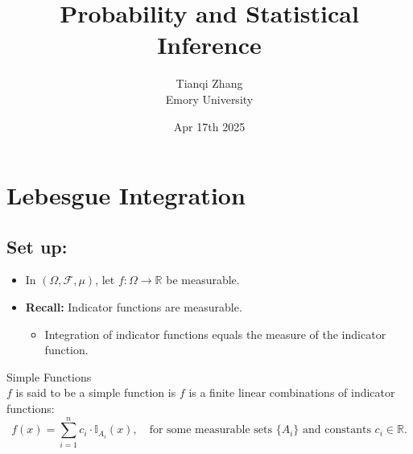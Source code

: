 

\title{\textbf{%
               Probability and Statistical Inference}}
\author{Tianqi Zhang\\
Emory University}
\date{Apr 17th 2025}


\maketitle


\setcounter{section}{12}
\section{Lebesgue Integration}
\subsection{Set up:}
\begin{itemize}
    \item In \((\Omega, \mathscr{F}, \mu)\), let \( f: \Omega \to \mathbb{R} \) be measurable.
    \item \textbf{Recall:} Indicator functions are measurable.
    \begin{itemize}
        \item Integration of indicator functions equals the measure of the indicator function.
    \end{itemize}
\end{itemize}

\begin{df}{Simple Functions}\\
$f$ is said to be a simple function is $f$ is a finite linear combinations of indicator functions:
\[
f(x) = \sum_{i=1}^n c_i \cdot \mathbb{I}_{A_i}(x), \quad \text{for some measurable sets } \{A_i\} \text{ and constants } c_i \in \mathbb{R}.
\]	
\end{df}

